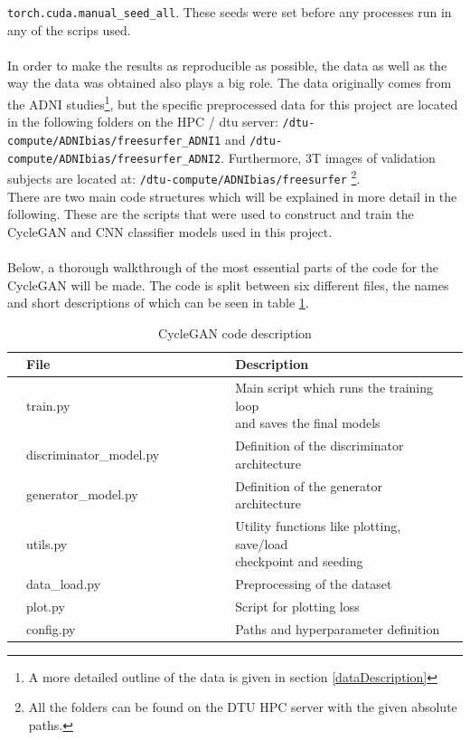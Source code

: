 \documentclass[11pt, fleqn, titlepage]{article}
\newcommand{\1}[1]{\mathds{1}\left[#1\right]}
\begin{document}
\texttt{torch.cuda.manual\_seed\_all}. These seeds were set before any processes run in any of the scrips used.
\\\\
In order to make the results as reproducible as possible, the data as well as the way the data was obtained also plays a big role. The data originally comes from the ADNI studies\footnote{A more detailed outline of the data is given in section \ref{dataDescription}}, but the specific preprocessed data for this project are located in the following folders on the HPC / dtu server: \texttt{/dtu-compute/ADNIbias/freesurfer\_ADNI1} and \texttt{/dtu-compute/ADNIbias/freesurfer\_ADNI2}. Furthermore, 3T images of validation subjects are located at: \texttt{/dtu-compute/ADNIbias/freesurfer}  \footnote{All the folders can be found on the DTU HPC server with the given absolute paths.}. \\

\noindent
There are two main code structures which will be explained in more detail in the following. These are the scripts that were used to construct and train the CycleGAN and CNN classifier models used in this project. 
\\\\
\noindent Below, a thorough walkthrough of the most essential parts of the code for the CycleGAN will be made. The code is split between six different files, the names and short descriptions of which can be seen in table \ref{fig:files}. 
\begin{table}[H]
		\hspace*{-2cm}
		\begin{tabular}{l l l l l l l l l}
			\toprule
			& \textbf{File}          & & & & & & \textbf{Description}  & \\ \midrule
			& train.py               & & & & & & \makecell[tl]{Main script which runs the training loop \\ and saves the final models} & \\
			& discriminator\_model.py& & & & & & Definition of the discriminator architecture & \\
			& generator\_model.py    & & & & & & Definition of the generator architecture & \\
			& utils.py               & & & & & & \makecell[tl]{Utility functions like plotting, save/load \\ checkpoint and seeding} & \\
			& data\_load.py             & & & & & & Preprocessing of the dataset & \\
			& plot.py             & & & & & & Script for plotting loss & \\
			& config.py              & & & & & & Paths and hyperparameter definition & \\ \bottomrule
		\end{tabular}
\caption{CycleGAN code description}
\label{fig:files}
\end{table}
\end{document}
